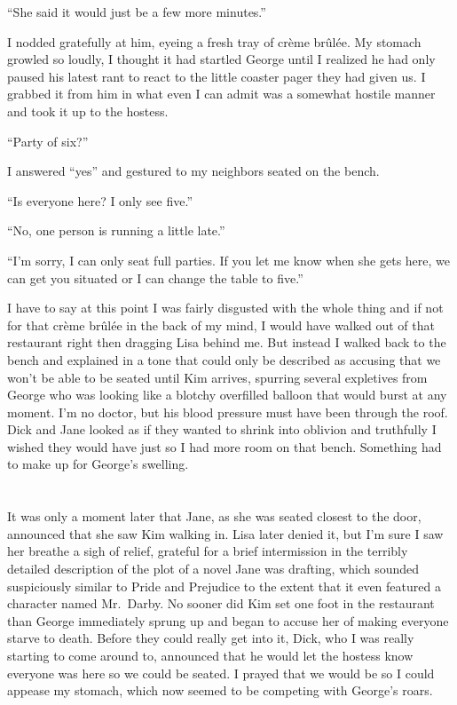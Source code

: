 \documentclass[]{book}
\begin{document}
``She said it would just be a few more minutes.''

I nodded gratefully at him, eyeing a fresh tray of crème brûlée. My
stomach growled so loudly, I thought it had startled George until I
realized he had only paused his latest rant to react to the little
coaster pager they had given us. I grabbed it from him in what even I
can admit was a somewhat hostile manner and took it up to the hostess.

``Party of six?''

I answered ``yes'' and gestured to my neighbors seated on the bench.

``Is everyone here? I only see five.''

``No, one person is running a little late.''

``I'm sorry, I can only seat full parties. If you let me know when she
gets here, we can get you situated or I can change the table to five.''

I have to say at this point I was fairly disgusted with the whole thing
and if not for that crème brûlée in the back of my mind, I would have
walked out of that restaurant right then dragging Lisa behind me. But
instead I walked back to the bench and explained in a tone that could
only be described as accusing that we won't be able to be seated until
Kim arrives, spurring several expletives from George who was looking
like a blotchy overfilled balloon that would burst at any moment. I'm no
doctor, but his blood pressure must have been through the roof. Dick and
Jane looked as if they wanted to shrink into oblivion and truthfully I
wished they would have just so I had more room on that bench. Something
had to make up for George's swelling.

\chapter{}\label{section-5}

It was only a moment later that Jane, as she was seated closest to the
door, announced that she saw Kim walking in. Lisa later denied it, but
I'm sure I saw her breathe a sigh of relief, grateful for a brief
intermission in the terribly detailed description of the plot of a novel
Jane was drafting, which sounded suspiciously similar to Pride and
Prejudice to the extent that it even featured a character named
Mr.~Darby. No sooner did Kim set one foot in the restaurant than George
immediately sprung up and began to accuse her of making everyone starve
to death. Before they could really get into it, Dick, who I was really
starting to come around to, announced that he would let the hostess know
everyone was here so we could be seated. I prayed that we would be so I
could appease my stomach, which now seemed to be competing with George's
roars.
\end{document}

